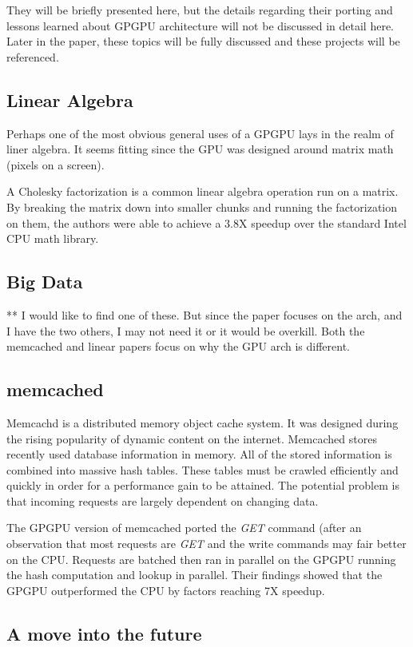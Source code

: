 They will be briefly presented here, but the details regarding their porting and lessons learned about GPGPU architecture will not be discussed in detail here. Later in the paper, these topics will be fully discussed and these projects will be referenced. 

\subsection*{Linear Algebra}

Perhaps one of the most obvious general uses of a GPGPU lays in the realm of liner algebra. It seems fitting since the GPU was designed around matrix math (pixels on a screen). 

A Cholesky factorization is a common linear algebra operation run on a matrix. By breaking the matrix down into smaller chunks and running the factorization on them, the authors were able to achieve a 3.8X speedup over the standard Intel CPU math library. \cite{linearalg}

\subsection*{Big Data}

** I would like to find one of these. But since the paper focuses on the arch, and I have the two others, I may not need it or it would be overkill. Both the memcached and linear papers focus on why the GPU arch is different. 

\subsection*{memcached}


Memcachd is a distributed memory object cache system. It was designed during the rising popularity of dynamic content on the internet. Memcached stores recently used database information in memory. All of the stored information is combined into massive hash tables. These tables must be crawled efficiently and quickly in order for a performance gain to be attained. The potential problem is that incoming requests are largely dependent on changing data. 

The GPGPU version of memcached ported the \textit{GET} command (after an observation that most requests are \textit{GET} and the write commands may fair better on the CPU. Requests are batched then ran in parallel on the GPGPU running the hash computation and lookup in parallel. Their findings showed that the GPGPU outperformed the CPU by factors reaching 7X speedup. \cite{memcached}


\subsection{A move into the future}














